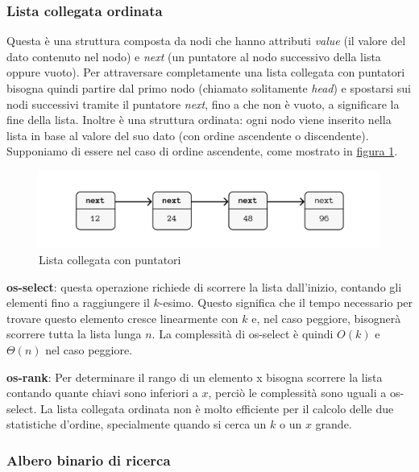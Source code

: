 \documentclass[onecolumn]{article}
\begin{document}
\subsubsection{Lista collegata ordinata}

Questa è una struttura composta da nodi che hanno attributi \textit{value} (il valore del dato contenuto nel nodo) e \textit{next} (un puntatore al nodo successivo della lista oppure vuoto). Per attraversare completamente una lista collegata con puntatori bisogna quindi partire dal primo nodo (chiamato solitamente \textit{head}) e spostarsi sui nodi successivi tramite il puntatore \textit{next}, fino a che non è vuoto, a significare la fine della lista. Inoltre è una struttura ordinata: ogni nodo viene inserito nella lista in base al valore del suo dato (con ordine ascendente o discendente). Supponiamo di essere nel caso di ordine ascendente, come mostrato in \hyperref[fig:lista]{figura 1}.

\begin{figure}
	\includegraphics[width=\linewidth]{lista.png}
	\caption{Lista collegata con puntatori}
	\label{fig:lista}
\end{figure}

\textbf{os-select}: questa operazione richiede di scorrere la lista dall'inizio, contando gli elementi fino a raggiungere il $k$-esimo. Questo significa che il tempo necessario per trovare questo elemento cresce linearmente con $k$ e, nel caso peggiore, bisognerà scorrere tutta la lista lunga $n$. La complessità di os-select è quindi $O(k)$ e $\Theta(n)$ nel caso peggiore. \vspace{0.5em}

\textbf{os-rank}: Per determinare il rango di un elemento x bisogna scorrere la lista contando quante chiavi sono inferiori a $x$, perciò le complessità sono uguali a os-select. La lista collegata ordinata non è molto efficiente per il calcolo delle due statistiche d'ordine, specialmente quando si cerca un $k$ o un $x$ grande. 

\subsubsection{Albero binario di ricerca}
\end{document}
